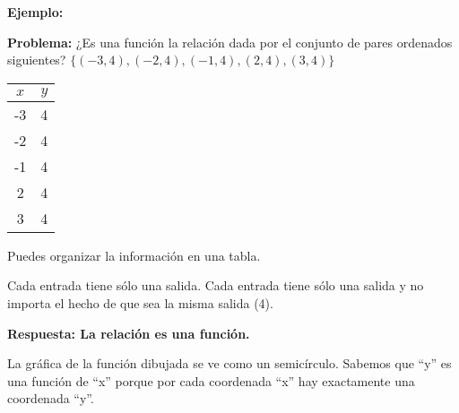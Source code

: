 \documentclass[12pt,a4paper]{article}
\begin{document}
\begin{tcolorbox}[colback=fondorosa,colframe=rojoclaro,title=\textbf{MINI-EXPLICACIÓN: CONCEPTO DE FUNCIONES},breakable]
\textbf{Ejemplo:}

\textbf{Problema:} ¿Es una función la relación dada por el conjunto de pares ordenados siguientes? $\{(-3, 4), (-2, 4), (-1, 4), (2, 4), (3, 4)\}$

\begin{center}
\begin{tabular}{|c|c|}
\hline
$x$ & $y$ \\
\hline
-3 & 4 \\
-2 & 4 \\
-1 & 4 \\
2 & 4 \\
3 & 4 \\
\hline
\end{tabular}
\end{center}

Puedes organizar la información en una tabla.

Cada entrada tiene sólo una salida. Cada entrada tiene sólo una salida y no importa el hecho de que sea la misma salida (4).

\textbf{Respuesta: La relación es una función.}

\vspace{0.5cm}

La gráfica de la función dibujada se ve como un semicírculo. Sabemos que ``y'' es una función de ``x'' porque por cada coordenada ``x'' hay exactamente una coordenada ``y''.

\end{tcolorbox}

\vspace{5mm}

\end{document}
